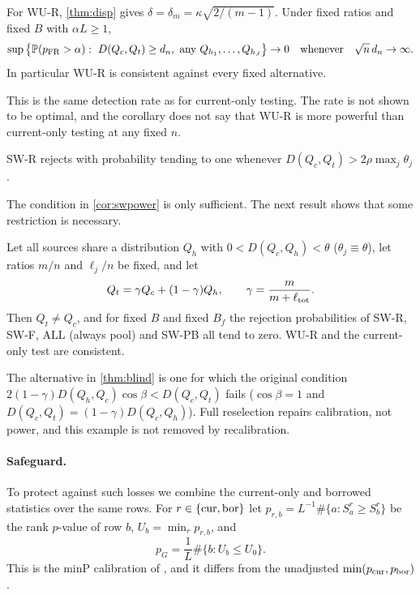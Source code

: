 \documentclass[11pt,a4paper]{article}
\begin{document}
\begin{corollary}\label{cor:uniform}
For WU-R, \cref{thm:disp} gives $\delta=\delta_m=\kappa\sqrt{2/(m-1)}$. Under fixed ratios and fixed $B$ with $\alpha L\ge1$,
\[
\sup\big\{\P(p_{\rm FR}>\alpha):\ D(Q_c,Q_t)\ge d_n,\ \text{any }Q_{h_1},\dots,Q_{h_J}\big\}\to0\quad\text{whenever}\quad\sqrt n\,d_n\to\infty .
\]
In particular WU-R is consistent against every fixed alternative.
\end{corollary}

This is the same detection rate as for current-only testing. The rate is not shown to be optimal, and the corollary does not say that WU-R is more powerful than current-only testing at any fixed $n$.

\begin{corollary}\label{cor:swpower}
SW-R rejects with probability tending to one whenever $D(Q_c,Q_t)>2\rho\max_j\theta_j$.
\end{corollary}

The condition in \cref{cor:swpower} is only sufficient. The next result shows that some restriction is necessary.

\begin{theorem}\label{thm:blind}
Let all sources share a distribution $Q_h$ with $0<D(Q_c,Q_h)<\theta$ ($\theta_j\equiv\theta$), let ratios $m/n$ and $\ell_j/n$ be fixed, and let
\[
Q_t=\gamma Q_c+(1-\gamma)Q_h,\qquad\gamma=\frac{m}{m+\ell_{\rm tot}} .
\]
Then $Q_t\neq Q_c$, and for fixed $B$ and fixed $B_f$ the rejection probabilities of SW-R, SW-F, ALL (always pool) and SW-PB all tend to zero. WU-R and the current-only test are consistent.
\end{theorem}

The alternative in \cref{thm:blind} is one for which the original condition $2(1-\gamma)D(Q_h,Q_c)\cos\beta<D(Q_c,Q_t)$ fails ($\cos\beta=1$ and $D(Q_c,Q_t)=(1-\gamma)D(Q_c,Q_h)$). Full reselection repairs calibration, not power, and this example is not removed by recalibration.

\paragraph{Safeguard.} To protect against such losses we combine the current-only and borrowed statistics over the same rows. For $r\in\{\rm cur,bor\}$ let $p_{r,b}=L^{-1}\#\{a:S^r_a\ge S^r_b\}$ be the rank $p$-value of row $b$, $U_b=\min_rp_{r,b}$, and
\begin{equation}\label{eq:pG}
p_G=\frac1L\#\{b:U_b\le U_0\}.
\end{equation}
This is the minP calibration of \citet{westfallyoung1993}, and it differs from the unadjusted $\min(p_{\rm cur},p_{\rm bor})$.
\end{document}
